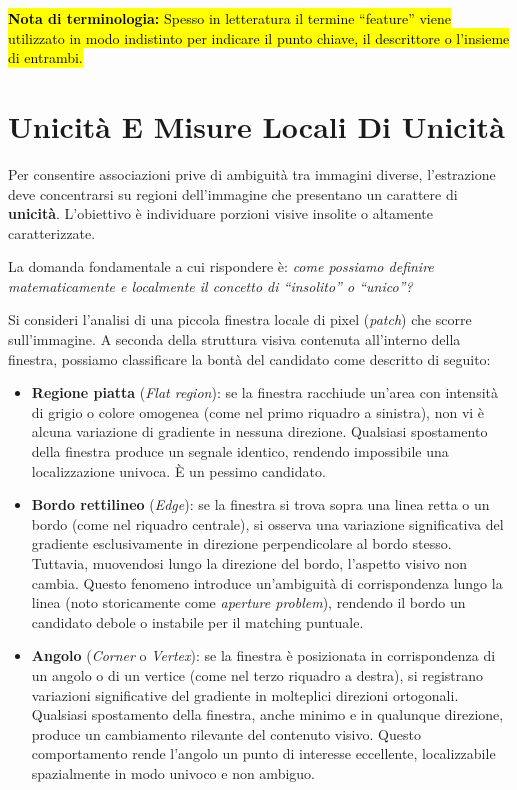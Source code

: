﻿\documentclass[11pt, a4paper]{article}
\begin{document}
\begin{center}
    \hl{\textbf{Nota di terminologia:} Spesso in letteratura il termine ``feature'' viene utilizzato in modo indistinto per indicare il punto chiave, il descrittore o l'insieme di entrambi.}
\end{center}

\newpage

\section{Unicità E Misure Locali Di Unicità}

Per consentire associazioni prive di ambiguità tra immagini diverse, l'estrazione deve concentrarsi su regioni dell'immagine che presentano un carattere di \textbf{unicità}. L'obiettivo è individuare porzioni visive insolite o altamente caratterizzate.

La domanda fondamentale a cui rispondere è: \emph{come possiamo definire matematicamente e localmente il concetto di ``insolito'' o ``unico''?}

Si consideri l'analisi di una piccola finestra locale di pixel (\emph{patch}) che scorre sull'immagine. A seconda della struttura visiva contenuta all'interno della finestra, possiamo classificare la bontà del candidato come descritto di seguito:


\begin{itemize}
    \item \textbf{Regione piatta} (\emph{Flat region}): se la finestra racchiude un'area con intensità di grigio o colore omogenea (come nel primo riquadro a sinistra), non vi è alcuna variazione di gradiente in nessuna direzione. Qualsiasi spostamento della finestra produce un segnale identico, rendendo impossibile una localizzazione univoca. È un pessimo candidato.

    \item \textbf{Bordo rettilineo} (\emph{Edge}): se la finestra si trova sopra una linea retta o un bordo (come nel riquadro centrale), si osserva una variazione significativa del gradiente esclusivamente in direzione perpendicolare al bordo stesso. Tuttavia, muovendosi lungo la direzione del bordo, l'aspetto visivo non cambia. Questo fenomeno introduce un'ambiguità di corrispondenza lungo la linea (noto storicamente come \emph{aperture problem}), rendendo il bordo un candidato debole o instabile per il matching puntuale.

    \item \textbf{Angolo} (\emph{Corner} o \emph{Vertex}): se la finestra è posizionata in corrispondenza di un angolo o di un vertice (come nel terzo riquadro a destra), si registrano variazioni significative del gradiente in molteplici direzioni ortogonali. Qualsiasi spostamento della finestra, anche minimo e in qualunque direzione, produce un cambiamento rilevante del contenuto visivo. Questo comportamento rende l'angolo un punto di interesse eccellente, localizzabile spazialmente in modo univoco e non ambiguo.
\end{itemize}
\end{document}
